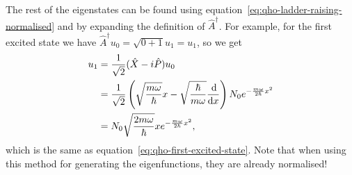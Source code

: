 \documentclass[../quantum_mechanics.tex]{subfiles}
\begin{document}
            The rest of the eigenstates can be found using equation~\ref{eq:qho-ladder-raising-normalised} and by expanding the definition of $\hat{A}^\dagger$.
            For example, for the first excited state we have $\hat{A}^\dagger u_0=\sqrt{0+1}u_1=u_1$, so we get
            \begin{align}
                u_1&=\frac{1}{\sqrt{2}}(\hat{X}-i\hat{P})u_0\\
                &=\frac{1}{\sqrt{2}}\left(\sqrt{\frac{m\omega}{\hbar}}x-\sqrt{\frac{\hbar}{m\omega}}\dv{}{x}\right)N_0e^{-\frac{m\omega}{2\hbar}x^2}\\
                &=N_0\sqrt{\frac{2m\omega}{\hbar}}xe^{-\frac{m\omega}{2\hbar}x^2},
            \end{align}
            which is the same as equation~\ref{eq:qho-first-excited-state}.
            Note that when using this method for generating the eigenfunctions, they are already normalised!

\end{document}
